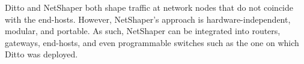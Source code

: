 Ditto \cite{meier2022ditto} and NetShaper both shape traffic at network nodes that do not coincide with the end-hosts.
However, NetShaper's approach is hardware-independent, modular, and portable.
As such, NetShaper can be integrated into routers, gateways, end-hosts, and even programmable switches such as the one on which Ditto was deployed.
